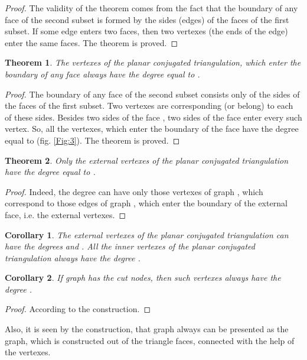 \documentclass{amsart}
\newtheorem{theorem}{Theorem}
\theoremstyle{plain}
\newtheorem{corollary}{Corollary}
\numberwithin{equation}{section}
\begin{document}
\begin {proof}
The validity of the theorem comes from the fact that the boundary of any face of the second subset  is formed by the sides (edges) of the faces  of the first subset. If some edge enters two faces, then two vertexes (the ends of the edge) enter the same faces. The theorem is proved.
\end {proof}

\begin{theorem}
The vertexes of the planar conjugated triangulation, which enter the boundary of any face  always have the degree equal to .
\end {theorem}

\begin {proof}
The boundary of any face  of the second subset consists only of the sides of the faces  of the first subset. Two vertexes are corresponding (or belong) to each of these sides. Besides two sides of the face , two sides of the face  enter every such vertex. So, all the vertexes, which enter the boundary of the face  have the degree equal to  (fig. \ref{Fig:3}). The theorem is proved.
\end {proof}

\begin{theorem}
Only the external vertexes of the planar conjugated triangulation have the degree equal to .
\end {theorem}

\begin {proof}
Indeed, the degree  can have only those vertexes of graph , which correspond to those edges of graph , which enter the boundary of the external face, i.e. the external vertexes.
\end {proof}

\begin{corollary}
The external vertexes of the planar conjugated triangulation can have the degrees  and . All the inner vertexes of the planar conjugated triangulation always have the degree .
\end {corollary}

\begin{corollary}
If graph  has the cut nodes, then such vertexes always have the degree .
\end {corollary}

\begin {proof}
According to the construction.
\end {proof}

Also, it is seen by the construction, that graph  always can be presented as the graph, which is constructed out of the triangle faces, connected with the help of the vertexes.
\end{document}

